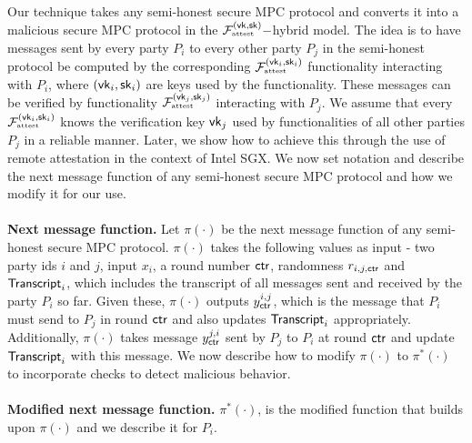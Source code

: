 Our technique takes any semi-honest secure MPC protocol and converts
it into a malicious secure MPC protocol in the
$\mathcal{F}_{\textrm{\tiny{attest}}}^{(\mathsf{vk},\mathsf{sk})}-$hybrid model. The idea is to have messages
sent by every party $P_i$ to every other party $P_j$ in the
semi-honest protocol be computed by the corresponding
$\mathcal{F}_{\textrm{\tiny{attest}}}^{(\mathsf{vk}_i,\mathsf{sk}_i)}$ functionality interacting with $P_i$,
where $(\mathsf{vk}_i,\mathsf{sk}_i)$ are keys used by the functionality.
These messages can be verified by functionality $\mathcal{F}_{\textrm{\tiny{attest}}}^{(\mathsf{vk}_j,\mathsf{sk}_j)}$ interacting with $P_j$. 
We assume that every $\mathcal{F}_{\textrm{\tiny{attest}}}^{(\mathsf{vk}_i,\mathsf{sk}_i)}$ knows the verification key $\mathsf{vk}_j$ used by functionalities of all other parties $P_j$ in a reliable manner. 
Later, we show how to achieve this through the use of remote attestation in the context of Intel SGX. We now set notation and describe the next message function of any semi-honest secure MPC protocol and how we modify it for our use.
\\\\
\noindent\textbf{Next message function.} Let $\pi(\cdot)$ be the next message function of any semi-honest secure MPC protocol. $\pi(\cdot)$ takes the following values as input - two party ids $i$ and $j$, input $x_i$, a round number $\mathsf{ctr}$, randomness $r_{i,j,\mathsf{ctr}}$ and $\mathsf{Transcript}_i$, which includes the transcript of all messages sent and received by the party $P_i$ so far. 
Given these, $\pi(\cdot)$ outputs $y_{\mathsf{ctr}}^{i,j}$, which is the message that $P_i$ must send to $P_j$ in round $\mathsf{ctr}$ and also updates $\mathsf{Transcript}_i$ appropriately. Additionally, $\pi(\cdot)$ takes message $y_{\mathsf{ctr}}^{j,i}$ sent by $P_j$ to $P_i$ at round $\mathsf{ctr}$ and update $\mathsf{Transcript}_i$ with this message. We now describe how to modify $\pi(\cdot)$ to $\pi^*(\cdot)$ to incorporate checks to detect malicious behavior.
\\\\
\noindent\textbf{Modified next message function.} $\pi^*(\cdot)$, is the modified function that builds upon $\pi(\cdot)$ and we describe it for $P_i$.

